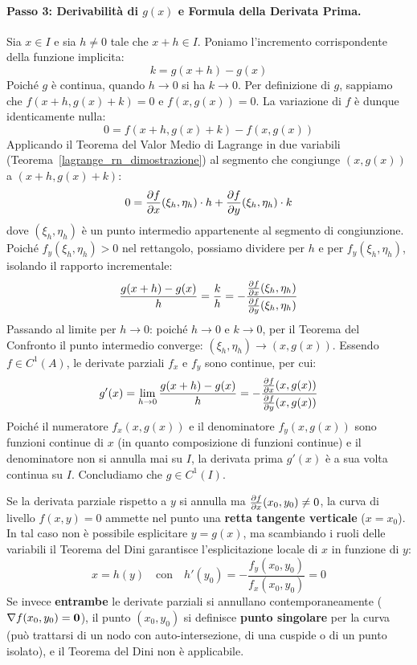 \begin{dimostrazione}
\paragraph{Passo 3: Derivabilità di $g(x)$ e Formula della Derivata Prima.}
Sia $x \in I$ e sia $h \neq 0$ tale che $x + h \in I$. Poniamo l'incremento corrispondente della funzione implicita:
\[
k = g(x + h) - g(x)
\]
Poiché $g$ è continua, quando $h \to 0$ si ha $k \to 0$.
Per definizione di $g$, sappiamo che $f(x+h, g(x)+k) = 0$ e $f(x, g(x)) = 0$. La variazione di $f$ è dunque identicamente nulla:
\[
0 = f(x + h, g(x) + k) - f(x, g(x))
\]
Applicando il Teorema del Valor Medio di Lagrange in due variabili (Teorema~\ref{lagrange_rn_dimostrazione}) al segmento che congiunge $(x, g(x))$ a $(x+h, g(x)+k)$:
\[
0 = \frac{\partial f}{\partial x}(\xi_h, \eta_h) \cdot h + \frac{\partial f}{\partial y}(\xi_h, \eta_h) \cdot k
\]
dove $(\xi_h, \eta_h)$ è un punto intermedio appartenente al segmento di congiunzione.\\
Poiché $f_y(\xi_h, \eta_h) > 0$ nel rettangolo, possiamo dividere per $h$ e per $f_y(\xi_h, \eta_h)$, isolando il rapporto incrementale:
\[
\frac{g(x+h) - g(x)}{h} = \frac{k}{h} = -\frac{\frac{\partial f}{\partial x}(\xi_h, \eta_h)}{\frac{\partial f}{\partial y}(\xi_h, \eta_h)}
\]
Passando al limite per $h \to 0$: poiché $h \to 0$ e $k \to 0$, per il Teorema del Confronto il punto intermedio converge: $(\xi_h, \eta_h) \to (x, g(x))$.
Essendo $f \in C^1(A)$, le derivate parziali $f_x$ e $f_y$ sono continue, per cui:
\[
g'(x) = \lim_{h \to 0} \frac{g(x+h) - g(x)}{h} = -\frac{\frac{\partial f}{\partial x}(x, g(x))}{\frac{\partial f}{\partial y}(x, g(x))}
\]
Poiché il numeratore $f_x(x, g(x))$ e il denominatore $f_y(x, g(x))$ sono funzioni continue di $x$ (in quanto composizione di funzioni continue) e il denominatore non si annulla mai su $I$, la derivata prima $g'(x)$ è a sua volta continua su $I$. Concludiamo che $g \in C^1(I)$.
\end{dimostrazione}

\begin{osservazione}[Cosa accade se $f_y(x_0, y_0) = 0$ ma $f_x(x_0, y_0) \neq 0$?]
Se la derivata parziale rispetto a $y$ si annulla ma $\frac{\partial f}{\partial x}(x_0, y_0) \neq 0$, la curva di livello $f(x,y) = 0$ ammette nel punto una \textbf{retta tangente verticale} ($x = x_0$). In tal caso non è possibile esplicitare $y = g(x)$, ma scambiando i ruoli delle variabili il Teorema del Dini garantisce l'esplicitazione locale di $x$ in funzione di $y$:
\[
x = h(y) \quad \text{con} \quad h'(y_0) = -\frac{f_y(x_0, y_0)}{f_x(x_0, y_0)} = 0
\]
Se invece \textbf{entrambe} le derivate parziali si annullano contemporaneamente ($\nabla f(x_0, y_0) = \mathbf{0}$), il punto $(x_0, y_0)$ si definisce \textbf{punto singolare} per la curva (può trattarsi di un nodo con auto-intersezione, di una cuspide o di un punto isolato), e il Teorema del Dini non è applicabile.
\end{osservazione}

